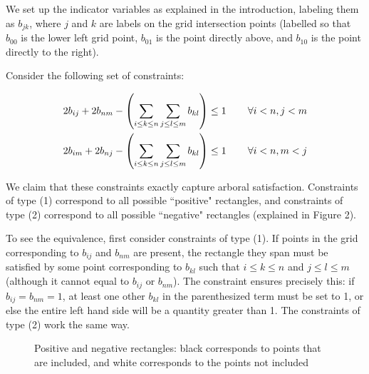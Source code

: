 \documentclass[11pt]{article}
\begin{document}
We set up the indicator variables as explained in the introduction, labeling them as $b_{jk}$, where $j$ and $k$ are labels on the grid intersection points (labelled so that $b_{00}$ is the lower left grid point, $b_{01}$ is the point directly above, and $b_{10}$ is the point directly to the right).

Consider the following set of constraints:

\begin{align}
2b_{ij} + 2b_{nm} - \left(\sum_{i \leq k \leq n}\sum_{j\leq l \leq m} b_{kl}\right) &\leq 1  \hspace{.3in} \forall i<n, j<m \\
2b_{im} + 2b_{nj} - \left(\sum_{i \leq k \leq n}\sum_{j\leq l \leq m} b_{kl}\right)  &\leq 1  \hspace{.3in} \forall i<n, m<j
\end{align}

We claim that these constraints exactly capture arboral satisfaction. Constraints of type (1) correspond to all possible ``positive" rectangles, and constraints of type (2) correspond to all possible ``negative" rectangles (explained in Figure 2).

To see the equivalence, first consider constraints of type (1). If points in the grid corresponding to $b_{ij}$ and $b_{nm}$ are present, the rectangle they span must be satisfied by some point corresponding to $b_{kl}$ such that   $i\leq k \leq n$ and $j \leq l \leq m$ (although it cannot equal to $b_{ij}$ or $b_{nm}$). The constraint ensures precisely this: if $b_{ij} = b_{nm} = 1$, at least one other $b_{kl}$ in the parenthesized term must be set to 1, or else the entire left hand side will be a quantity greater than 1. The constraints of type (2) work the same way.

\begin{figure}
\centering
{}
\caption{Positive and negative rectangles: black corresponds to points that are included, and white corresponds to the points not included}
\label{fig:rectangles}
\end{figure}
\end{document}
